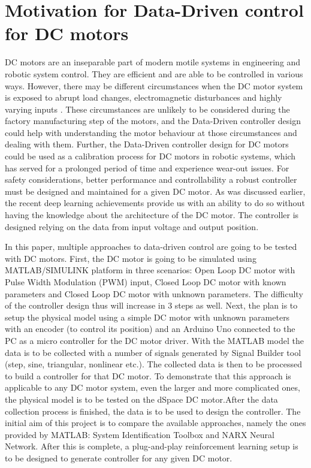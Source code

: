 \documentclass[]{final_report}
\begin{document}
\section{Motivation for Data-Driven control for DC motors}
DC motors are an inseparable part of modern motile systems in engineering and robotic system control. They are efficient and are able to be controlled in various ways. However, there may be different circumstances when the DC motor system is exposed to abrupt load changes, electromagnetic disturbances and highly varying inputs \cite{naung2018a}. These circumstances are unlikely to be considered during the factory manufacturing step of the motors, and the Data-Driven controller design could help with understanding the motor behaviour at those circumstances and dealing with them. Further, the Data-Driven controller design for DC motors could be used as a calibration process for DC motors in robotic systems, which has served for a prolonged period of time and experience wear-out issues. For safety considerations, better performance and controllability a robust controller must be designed and maintained for a given DC motor. As was discussed earlier, the recent deep learning achievements provide us with an ability to do so without having the knowledge about the architecture of the DC motor. The controller is designed relying on the data from input voltage and output position. 

In this paper, multiple approaches to data-driven control are going to be tested with DC motors. First, the DC motor is going to be simulated using MATLAB/SIMULINK  platform in three scenarios: Open Loop DC motor with Pulse Width Modulation (PWM) input, Closed Loop DC motor with known parameters and Closed Loop DC motor with unknown parameters. The difficulty of the controller design thus will increase in 3 steps as well. Next, the plan is to setup the physical model using a simple DC motor with unknown parameters with an encoder (to control its position) and an Arduino Uno connected to the PC as a micro controller for the DC motor driver. With the MATLAB model the data is to be collected with a number of signals generated by Signal Builder tool (step, sine, triangular, nonlinear etc.). The collected data is then to be processed to build a controller for that DC motor. To demonstrate that this approach is applicable to any DC motor system, even the larger and more complicated ones, the physical model is to be tested on the dSpace DC motor.After the data collection process is finished, the data is to be used to design the controller. The initial aim of this project is to compare the available approaches, namely the ones provided by MATLAB: System Identification Toolbox and NARX Neural Network. After this is complete, a plug-and-play reinforcement learning setup is to be designed to generate controller for any given DC motor.
\end{document}
